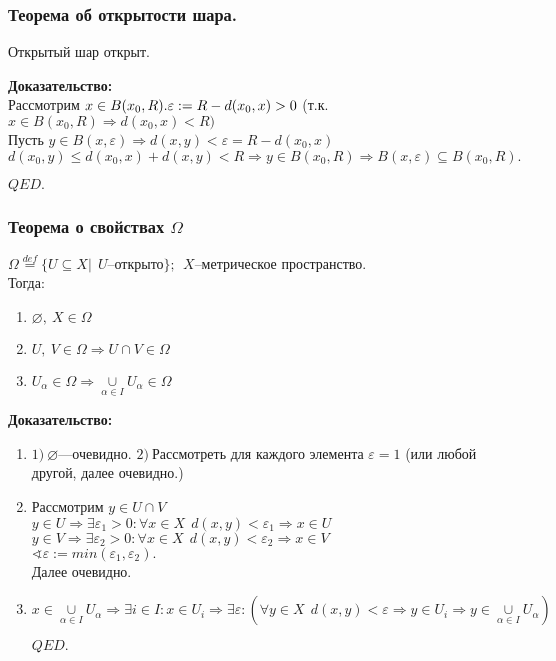 \documentclass{article}
\begin{document}
\subsubsection{Теорема об открытости шара.}
Открытый шар открыт.
\begin{spacing}{1.5}
 \textbf{Доказательство:}\\
Рассмотрим $ x\in B(x_{0}, R).  \\
  \varepsilon :=R-d(x_{0}, x)>0 $
 (т.к. $x\in B(x_{0}, R)\Rightarrow d(x_{0}, x)<R)$
 \\Пусть $y\in B(x, \varepsilon)\Rightarrow d(x, y)<\varepsilon = R-d(x_{0}, x) $
 \\$d(x_{0}, y)\leq d(x_{0}, x)+d(x, y)<R\Rightarrow y\in B(x_{0}, R)\Rightarrow B(x, \varepsilon)\subseteq B(x_{0}, R). $
\begin{flushright}
$QED.$
\end{flushright}
\subsubsection{Теорема о свойствах $\Omega$}
$\Omega \overset{def}{=} \lbrace U\subseteq X |~~ U$--открыто$\rbrace;~~X$--метрическое пространство.
\\Тогда:
\begin{enumerate}
\item $\varnothing ,~X\in \Omega$
\item $U,~V\in \Omega \Rightarrow U\cap V\in \Omega$
\item $U_{\alpha}\in \Omega \Rightarrow \underset{\alpha\in I}{\cup}U_{\alpha}\in \Omega$
\end{enumerate}
 \textbf{Доказательство:}
 \begin{enumerate}
 	\item 
 	$1)~\varnothing$---очевидно.
 	$2)~$Рассмотреть для каждого элемента $\varepsilon=1$ (или любой другой, далее очевидно.)
 	\item Рассмотрим $ y\in U\cap V$
 	\\$y\in U \Rightarrow \exists \varepsilon_{1}>0:\forall x\in X~~ d(x, y)<\varepsilon_{1}\Rightarrow x\in U$
 	\\$y\in V \Rightarrow \exists \varepsilon_{2}>0:\forall x\in X~~ d(x, y)<\varepsilon_{2}\Rightarrow x\in V$
 	\\$\sphericalangle \varepsilon:=min(\varepsilon_{1}, \varepsilon_{2}).$
 	\\Далее очевидно.
 	\item $x\in \underset{\alpha\in I}{\cup}U_{\alpha}\Rightarrow \exists i\in I: x\in U_{i}\Rightarrow\exists\varepsilon : (\forall y\in X~~ d(x, y)<\varepsilon\Rightarrow y\in U_{i}\Rightarrow y\in \underset{\alpha\in I}{\cup}U_{\alpha}) $
 	\begin{flushright}
$QED.$
\end{flushright}
\end{enumerate}

\end{spacing}
\end{document}
